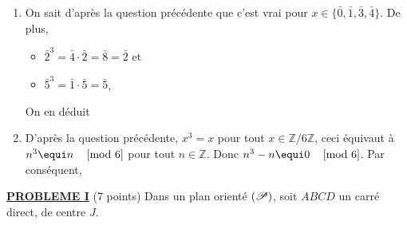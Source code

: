 \begin{description}
\begin{enumerate}
            Notons aussi que $\bar{3}^2 = \bar{3}$ et que $\bar{4}^2 = \bar{4}$.
            Pour $x \in \{ \bar{3} , \bar{4} \}$, montrons par r\'ecurrence que $x^p = x$ :
            \begin{itemize}
               \item $x^1 = x$ est toujours vraie.
               \item \textbf{HR :} Supposons que $x^p = x$,
               \item On a alors $x^{p+1} = x^p \cdot x = x \cdot x = x$.
            \end{itemize}
            Donc les quatre solutions de $x^p = x$ sont .
         \item {}
            On sait d'apr\`es la question pr\'ec\'edente que c'est vrai 
            pour $x \in \{ \bar{0} , \bar{1} , \bar{3} , \bar{4} \}$.
            De plus, 
            \begin{itemize}
               \item $\bar{2}^3 = \bar{4} \cdot \bar{2} = \bar{8} = \bar{2}$ et
               \item $\bar{5}^3 = \bar{1} \cdot \bar{5} = \bar{5}$,
            \end{itemize}
            On en d\'eduit
            \par\noindent{}
         \item {}
            D'apr\`es la question pr\'ec\'edente, $x^3 = x$ pour tout $x \in \mathbb{Z}/6\mathbb{Z}$,
            ceci \'equivaut \`a $\congru{n^3}{n}{6}$ pour tout $n\in\mathbb{Z}$.
            Donc $\congru{n^3 - n}{0}{6}$. Par cons\'equent,
            \par\noindent{}
      \end{enumerate}
\end{description}
\noindent \underline{\textsc{\textbf{PROBLEME I}}} (7 points) \newline
Dans un plan orient\'e $(\mathscr{P})$, soit $ABCD$ un carr\'e direct, de centre $J$.
